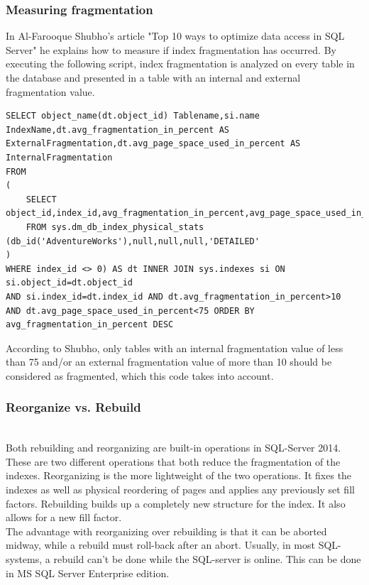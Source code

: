 \documentclass{cslthse-msc}
\begin{document}
\subsubsection*{Measuring fragmentation}
In Al-Farooque Shubho's article "Top 10 ways to optimize data access in SQL Server"\cite{Shubho09} he explains how to measure if index fragmentation has occurred. By executing the following script, index fragmentation is analyzed on every table in the database and presented in a table with an internal and external fragmentation value. 

\begin{lstlisting}[caption={Algorithm to find fragmented tables and the fragmentation values.},label=See DB-Fragmentation]
SELECT object_name(dt.object_id) Tablename,si.name
IndexName,dt.avg_fragmentation_in_percent AS
ExternalFragmentation,dt.avg_page_space_used_in_percent AS
InternalFragmentation
FROM
(
    SELECT object_id,index_id,avg_fragmentation_in_percent,avg_page_space_used_in_percent
    FROM sys.dm_db_index_physical_stats (db_id('AdventureWorks'),null,null,null,'DETAILED'
)
WHERE index_id <> 0) AS dt INNER JOIN sys.indexes si ON si.object_id=dt.object_id
AND si.index_id=dt.index_id AND dt.avg_fragmentation_in_percent>10
AND dt.avg_page_space_used_in_percent<75 ORDER BY avg_fragmentation_in_percent DESC
\end{lstlisting}

According to Shubho, only tables with an internal fragmentation value of less than 75 and/or an external fragmentation value of more than 10 should be considered as fragmented, which this code takes into account.

\subsubsection*{Reorganize vs. Rebuild}\mbox{}\\
Both rebuilding and reorganizing are built-in operations in SQL-Server 2014. These are two different operations that both reduce the fragmentation of the indexes. Reorganizing is the more lightweight of the two operations. It fixes the indexes as well as physical reordering of pages and applies any previously set fill factors. Rebuilding builds up a completely new structure for the index. It also allows for a new fill factor.\\
The advantage with reorganizing over rebuilding is that it can be aborted midway, while a rebuild must roll-back after an abort. Usually, in most SQL-systems, a rebuild can't be done while the SQL-server is online. This can be done in MS SQL Server Enterprise edition\cite{Little13}.
\end{document}
